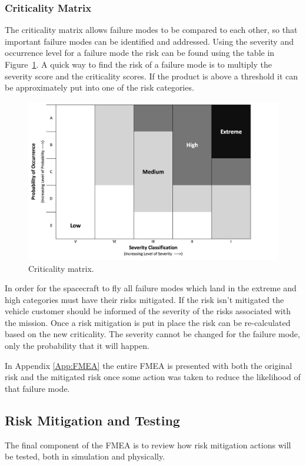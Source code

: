 \documentclass[paper=letter, fontsize=11pt]{scrartcl} %
\numberwithin{equation}{section} %
\numberwithin{figure}{section} %
\numberwithin{table}{section} %
\begin{document}
\subsubsection{Criticality Matrix}
The criticality matrix allows failure modes to be compared to each other, so that important failure modes can be identified and addressed. Using the severity and occurrence level for a failure mode the risk can be found using the table in Figure~\ref{fig:critMatrix}. A quick way to find the risk of a failure mode is to multiply the severity score and the criticality scores. If the product is above a threshold it can be approximately put into one of the risk categories.

\begin{figure}[H]
	\begin{center}
	\includegraphics [width=5.5in]{criticalityMatrix2.png}
	\caption{Criticality matrix.}
	\label{fig:critMatrix}
	\end{center}
\end{figure}

In order for the spacecraft to fly all failure modes which land in the extreme and high categories must have their risks mitigated. If the risk isn't mitigated the vehicle customer should be informed of the severity of the risks associated with the mission. Once a risk mitigation is put in place the risk can be re-calculated based on the new criticality. The severity cannot be changed for the failure mode, only the probability that it will happen.

In Appendix \ref{App:FMEA} the entire FMEA is presented with both the original risk and the mitigated risk once some action was taken to reduce the likelihood of that failure mode.

\subsection{Risk Mitigation and Testing}
The final component of the FMEA is to review how risk mitigation actions will be tested, both in simulation and physically.
\end{document}

